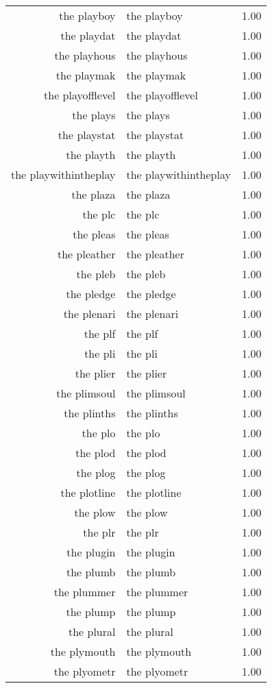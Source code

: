 \begin{table}[ht]
\begin{tabular}{rlr}
  the playboy & the playboy & 1.00 \\ 
  the playdat & the playdat & 1.00 \\ 
  the playhous & the playhous & 1.00 \\ 
  the playmak & the playmak & 1.00 \\ 
  the playofflevel & the playofflevel & 1.00 \\ 
  the plays & the plays & 1.00 \\ 
  the playstat & the playstat & 1.00 \\ 
  the playth & the playth & 1.00 \\ 
  the playwithintheplay & the playwithintheplay & 1.00 \\ 
  the plaza & the plaza & 1.00 \\ 
  the plc & the plc & 1.00 \\ 
  the pleas & the pleas & 1.00 \\ 
  the pleather & the pleather & 1.00 \\ 
  the pleb & the pleb & 1.00 \\ 
  the pledge & the pledge & 1.00 \\ 
  the plenari & the plenari & 1.00 \\ 
  the plf & the plf & 1.00 \\ 
  the pli & the pli & 1.00 \\ 
  the plier & the plier & 1.00 \\ 
  the plimsoul & the plimsoul & 1.00 \\ 
  the plinths & the plinths & 1.00 \\ 
  the plo & the plo & 1.00 \\ 
  the plod & the plod & 1.00 \\ 
  the plog & the plog & 1.00 \\ 
  the plotline & the plotline & 1.00 \\ 
  the plow & the plow & 1.00 \\ 
  the plr & the plr & 1.00 \\ 
  the plugin & the plugin & 1.00 \\ 
  the plumb & the plumb & 1.00 \\ 
  the plummer & the plummer & 1.00 \\ 
  the plump & the plump & 1.00 \\ 
  the plural & the plural & 1.00 \\ 
  the plymouth & the plymouth & 1.00 \\ 
  the plyometr & the plyometr & 1.00 \\ 

\end{tabular}
\end{table}
